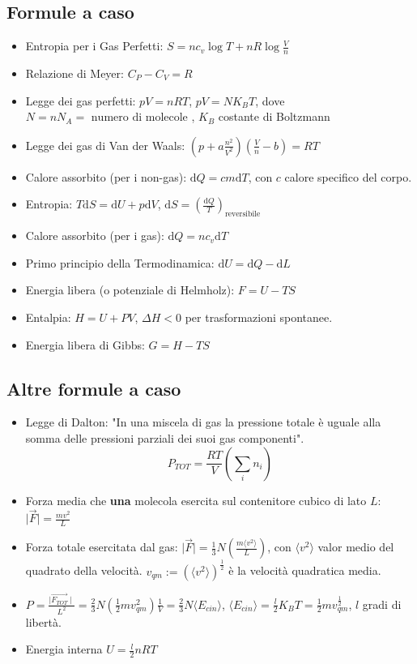 \documentclass[a4paper,11pt]{article}
\newcommand{\norm}[1]{\mid #1 \mid}
\newcommand{\ang}[1]{\langle #1 \rangle}
\begin{document}
\subsection*{Formule a caso}
\begin{itemize}
\item Entropia per i Gas Perfetti: $S = nc_v \log T + nR \log \frac{V}{n}$
\item Relazione di Meyer: $C_P - C_V = R$
\item Legge dei gas perfetti: $pV = nRT$, $pV = NK_BT$, dove $N = nN_A = \mbox{ numero di molecole }$, $K_B$ costante di Boltzmann
\item Legge dei gas di Van der Waals: $(p+a\frac{n^2}{V^2})(\frac{V}{n}-b) = RT$
\item Calore assorbito (per i non-gas): $\mbox{d}Q = c m \mbox{d}T$, con $c$ calore specifico del corpo.
\item Entropia: $T \mbox{d}S = \mbox{d}U + p \mbox{d}V$, $\mbox{d}S = \left(\frac{\mbox{d}Q}{T}\right)_{\mbox{reversibile}}$
\item Calore assorbito (per i gas): $\mbox{d}Q = n c_v \mbox{d}T$
\item Primo principio della Termodinamica: $\mbox{d}U = \mbox{d}Q - \mbox{d}L$
\item Energia libera (o potenziale di Helmholz): $F = U - TS$
\item Entalpia: $H = U + PV$, $\Delta H < 0$ per trasformazioni spontanee.
\item Energia libera di Gibbs: $G = H - TS$
\end{itemize}

\subsection*{Altre formule a caso}
\begin{itemize}
\item Legge di Dalton: "In una miscela di gas la pressione totale \`e uguale alla somma delle pressioni parziali dei suoi gas componenti". $$P_{TOT} = \frac{RT}{V}\left( \sum_{i} n_i \right)$$
\item Forza media che {\bf una} molecola esercita sul contenitore cubico di lato $L$: $\norm{\vec{F}} = \frac{mv^2}{L}$
\item Forza totale esercitata dal gas: $\norm{\vec{F}} = \frac{1}{3}N \left(\frac{m \ang{v^2}}{L} \right)$, con $\ang{v^2}$ valor medio del quadrato della velocit\`a. $v_{qm} := (\ang{v^2})^{\frac{1}{2}}$ \`e la velocit\`a quadratica media.
\item $P = \frac{\norm{\vec{F_{TOT}}}}{L^2} = \frac{2}{3} N \left(\frac{1}{2}m {v_{qm}^{2}} \right) \frac{1}{V} = \frac{2}{3} N \ang{E_{cin}}$, $\ang{E_{cin}} = \frac{l}{2}K_BT = \frac{1}{2}m{v_{qm}^\frac{1}{2}}$, $l$ gradi di libert\`a.
\item Energia interna $U = \frac{l}{2}nRT$
\end{itemize}
\end{document}
